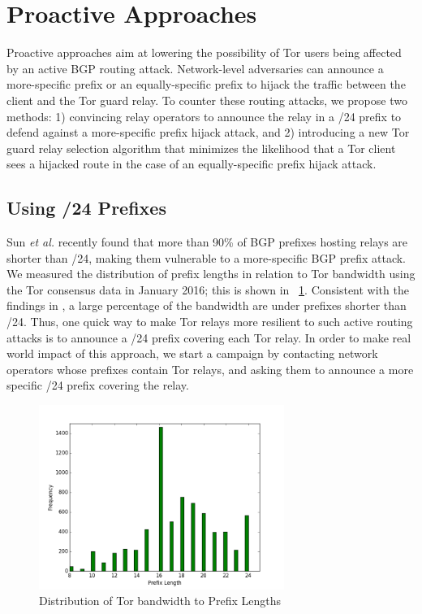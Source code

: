 \section{Proactive Approaches}
Proactive approaches aim at lowering the possibility of Tor users being affected by an active BGP routing attack. Network-level adversaries can announce a more-specific prefix or an equally-specific prefix to hijack the traffic between the client and the Tor guard relay. To counter these routing attacks, we propose two methods: 1) convincing relay operators to announce the relay in a /24 prefix to defend against a more-specific prefix hijack attack, and 2) introducing a new Tor guard relay selection algorithm that minimizes the likelihood that a Tor client sees a hijacked route in the case of an equally-specific prefix hijack attack.

\subsection{Using /24 Prefixes}
\label{subsec:24prefix}

Sun \emph{et al.} \cite{sun2015raptor} recently found that more than 90\% of BGP prefixes hosting relays are
shorter than /24, making them vulnerable to a more-specific BGP prefix attack. We measured the distribution of prefix lengths in relation to Tor bandwidth using the Tor consensus data in January 2016; this is shown in ~\ref{fig_prefixlen}. Consistent with the findings in \cite{sun2015raptor}, a large percentage of the bandwidth are under prefixes shorter than /24. Thus, one quick way to make Tor relays more resilient to such active routing attacks is to announce a /24 prefix covering each Tor relay. In order to make real world impact of this approach, we start a campaign by contacting network operators whose prefixes contain Tor relays, and asking them to announce a more specific /24 prefix covering the relay. 

\begin{figure}[ht!]
\centering
\includegraphics[width=80mm]{prefix_len_graph}
\caption{Distribution of Tor bandwidth to Prefix Lengths  \label{fig_prefixlen}}
\end{figure}

